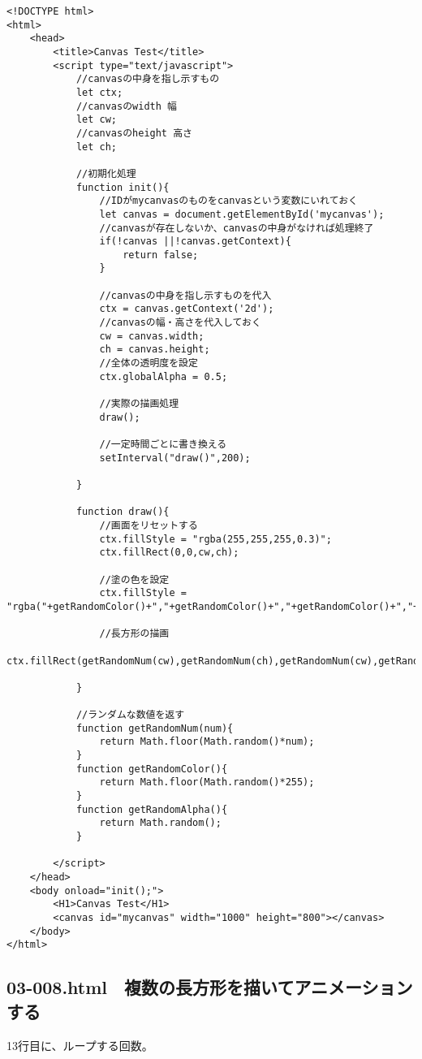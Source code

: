 \documentclass[mingoth,11pt,a4j,uplatex]{jsarticle}
\begin{document}
\begin{lstlisting}[caption=全体の透明度を設定してみる]
<!DOCTYPE html>
<html>
	<head>
		<title>Canvas Test</title>
		<script type="text/javascript">
			//canvasの中身を指し示すもの
			let ctx;
			//canvasのwidth 幅
			let cw;
			//canvasのheight 高さ
			let ch;
			
			//初期化処理
			function init(){
				//IDがmycanvasのものをcanvasという変数にいれておく
				let canvas = document.getElementById('mycanvas');
				//canvasが存在しないか、canvasの中身がなければ処理終了
				if(!canvas ||!canvas.getContext){
					return false;
				}
				
				//canvasの中身を指し示すものを代入
				ctx = canvas.getContext('2d');
				//canvasの幅・高さを代入しておく
				cw = canvas.width;
				ch = canvas.height;
				//全体の透明度を設定
				ctx.globalAlpha = 0.5;
				
				//実際の描画処理
				draw();
				
				//一定時間ごとに書き換える
				setInterval("draw()",200);

			}
			
			function draw(){
				//画面をリセットする
				ctx.fillStyle = "rgba(255,255,255,0.3)";
				ctx.fillRect(0,0,cw,ch);
				
				//塗の色を設定
				ctx.fillStyle = "rgba("+getRandomColor()+","+getRandomColor()+","+getRandomColor()+","+getRandomAlpha()+")";
				
				//長方形の描画
				ctx.fillRect(getRandomNum(cw),getRandomNum(ch),getRandomNum(cw),getRandomNum(ch));

			}
			
			//ランダムな数値を返す
			function getRandomNum(num){
				return Math.floor(Math.random()*num);
			}
			function getRandomColor(){
				return Math.floor(Math.random()*255);
			}
			function getRandomAlpha(){
				return Math.random();
			}

		</script>
	</head>
	<body onload="init();">
		<H1>Canvas Test</H1>
		<canvas id="mycanvas" width="1000" height="800"></canvas>
	</body>
</html>
\end{lstlisting}

\subsection{03-008.html　複数の長方形を描いてアニメーションする}
13行目に、ループする回数。
\end{document}
